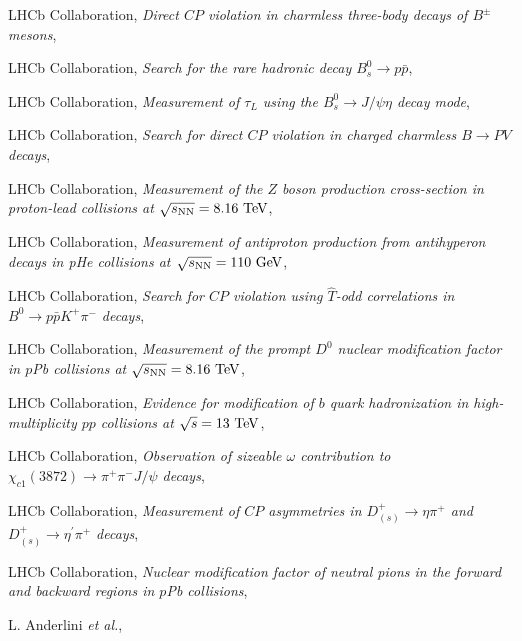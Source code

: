 \begin{cvcontent}
\begin{enumerate}[label={[\arabic*]}, leftmargin=1.5cm]
    \sloppy
    \item LHCb Collaboration,
    \emph{Direct $CP$ violation in charmless three-body decays of $B^{\pm}$ mesons},
    \item LHCb Collaboration,
    \emph{Search for the rare hadronic decay $B_s^0\to p \bar{p}$},
    \item LHCb Collaboration,
    \emph{Measurement of $\tau_{L}$ using the $B_{s}^{0} \to J/\psi \eta$ decay mode},
    \item LHCb Collaboration,
    \emph{Search for direct $CP$ violation in charged charmless $B \to PV$ decays},
    \item LHCb Collaboration,
    \emph{Measurement of the $Z$ boson production cross-section in proton-lead collisions at $\sqrt{s_{\rm{NN}}}=8.16~\rm{TeV}$},
    \item LHCb Collaboration,
    \emph{Measurement of antiproton production from antihyperon decays in pHe collisions at $\sqrt{s_{\rm{NN}}}=110~\rm{GeV}$},
    \item LHCb Collaboration,
    \emph{Search for $CP$ violation using $\hat{T}$-odd correlations in $B^{0} \to p \bar p K^{+} \pi^{-}$ decays},
    \item LHCb Collaboration,
    \emph{Measurement of the prompt $D^0$ nuclear modification factor in $p$Pb collisions at $\sqrt{s_{\rm{NN}}} = 8.16~{\rm{TeV}}$},
    \item LHCb Collaboration,
    \emph{Evidence for modification of $b$ quark hadronization in high-multiplicity $pp$ collisions at $\sqrt{s} = 13~\rm{TeV}$},
    \item LHCb Collaboration,
    \emph{Observation of sizeable $\omega$ contribution to $\chi_{c1}(3872) \to \pi^+ \pi^- J/\psi$ decays},
    \item LHCb Collaboration,
    \emph{Measurement of $CP$ asymmetries in $D^+_{(s)}\rightarrow \eta \pi^+$ and $D^+_{(s)}\rightarrow \eta^{\prime} \pi^+$ decays},
    \item LHCb Collaboration,
    \emph{Nuclear modification factor of neutral pions in the forward and backward regions in $p$Pb collisions},
    \item L. Anderlini \emph{et al.},

\end{enumerate}
\end{cvcontent}
